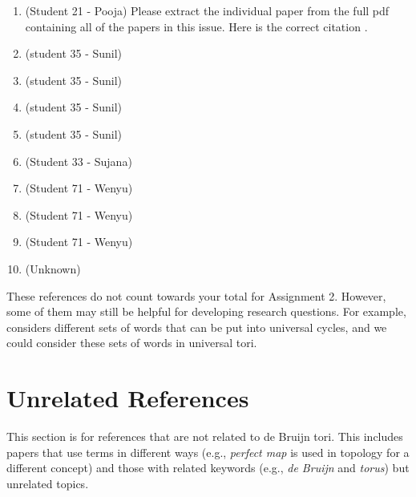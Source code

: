 \documentclass{article}
\begin{document}
\begin{enumerate}[label=R\arabic*,noitemsep,nolistsep]
\item \cite{springer_10.1007/3-540-39118-5_2} (Student 21 - Pooja)
Please extract the individual paper from the full pdf containing all of the papers in this issue.
Here is the correct citation \cite{gunther1987alternating}.
\item \cite{kang2025_zeros} (student 35 - Sunil)
\item \cite{chee2024covering} (student 35 - Sunil)
\item \cite{harbane2001efficient} (student 35 - Sunil)
\item \cite{ivanyi1989construction} (student 35 - Sunil)
\item \cite{salikhov2014using} (Student 33 - Sujana)
\item \cite{fraigniaud1994methods} (Student 71 - Wenyu)
\item \cite{samatham1989bruijn} (Student 71 - Wenyu)
\item \cite{gabric2019successor} (Student 71 - Wenyu)
\item \cite{andreae1994cartesian} (Unknown)
\end{enumerate}

These references do not count towards your total for Assignment 2.
However, some of them may still be helpful for developing research questions.
For example, \cite{sawada2016generalizing} considers different sets of words that can be put into universal cycles, and we could consider these sets of words in universal tori.


\section{Unrelated References}
\label{sec:unrelated}

This section is for references that are not related to de Bruijn tori.
This includes papers that use terms in different ways (e.g., \emph{perfect map} is used in topology for a different concept) and those with related keywords (e.g., \emph{de Bruijn} and \emph{torus}) but unrelated topics.
\end{document}
